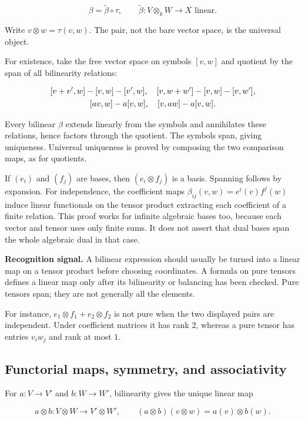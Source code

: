 \documentclass[
  11pt,
]{article}
\begin{document}
\[\beta=\widetilde\beta\circ\tau,
\qquad \widetilde\beta:V\otimes_k W\to X\text{ linear}.\]

Write \(v\otimes w=\tau(v,w)\). The pair, not the bare vector space, is
the universal object.

For existence, take the free vector space on symbols \([v,w]\) and
quotient by the span of all bilinearity relations:

\[\begin{gathered}
\relax[v+v',w]-[v,w]-[v',w],\quad
[v,w+w']-[v,w]-[v,w'],\\
[av,w]-a[v,w],\quad[v,aw]-a[v,w].
\end{gathered}\]

Every bilinear \(\beta\) extends linearly from the symbols and
annihilates these relations, hence factors through the quotient. The
symbols span, giving uniqueness. Universal uniqueness is proved by
composing the two comparison maps, as for quotients.

If \((e_i)\) and \((f_j)\) are bases, then \((e_i\otimes f_j)\) is a
basis. Spanning follows by expansion. For independence, the coefficient
maps \(\beta_{ij}(v,w)=e^i(v)f^j(w)\) induce linear functionals on the
tensor product extracting each coefficient of a finite relation. This
proof works for infinite algebraic bases too, because each vector and
tensor uses only finite sums. It does not assert that dual bases span
the whole algebraic dual in that case.

\textbf{Recognition signal.} A bilinear expression should usually be
turned into a linear map on a tensor product before choosing
coordinates. A formula on pure tensors defines a linear map only after
its bilinearity or balancing has been checked. Pure tensors span; they
are not generally all the elements.

For instance, \(e_1\otimes f_1+e_2\otimes f_2\) is not pure when the two
displayed pairs are independent. Under coefficient matrices it has rank
\(2\), whereas a pure tensor has entries \(v_iw_j\) and rank at most
\(1\).

\subsection{Functorial maps, symmetry, and
associativity}\label{functorial-maps-symmetry-and-associativity}

For \(a:V\to V'\) and \(b:W\to W'\), bilinearity gives the unique linear
map

\[a\otimes b:V\otimes W\to V'\otimes W',\qquad
(a\otimes b)(v\otimes w)=a(v)\otimes b(w).\]
\end{document}
